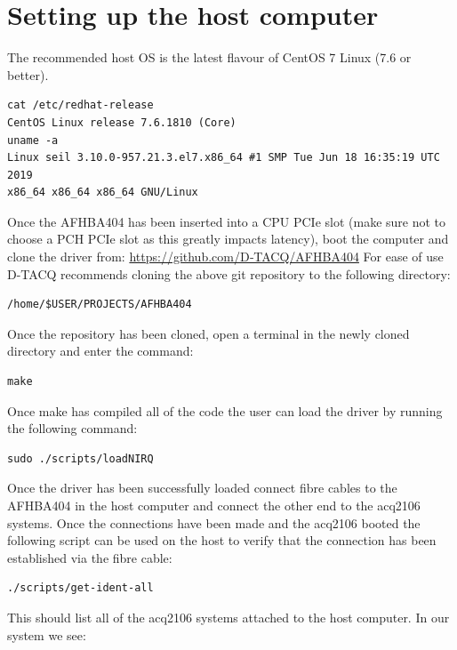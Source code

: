 \documentclass{article}
\begin{document}
\section{Setting up the host computer} \label{settinguphost}
The recommended host OS is the latest flavour of CentOS 7 Linux (7.6 or better).

\begin{verbatim}
cat /etc/redhat-release 
CentOS Linux release 7.6.1810 (Core) 
uname -a
Linux seil 3.10.0-957.21.3.el7.x86_64 #1 SMP Tue Jun 18 16:35:19 UTC 2019
x86_64 x86_64 x86_64 GNU/Linux
\end{verbatim}

Once the AFHBA404 has been inserted into a CPU PCIe slot (make sure not to choose a PCH PCIe slot as this greatly impacts latency), boot the computer and clone the driver from:
\newline
\href{https://github.com/D-TACQ/AFHBA404}{https://github.com/D‑TACQ/AFHBA404}
\newline
For ease of use \mbox{D-TACQ}  recommends cloning the above git repository to the following directory:

\begin{verbatim}
/home/$USER/PROJECTS/AFHBA404
\end{verbatim}

Once the repository has been cloned, open a terminal in the newly cloned directory and enter the command:

\begin{verbatim}
make
\end{verbatim}

Once make has compiled all of the code the user can load the driver by running the following command:

\begin{verbatim}
sudo ./scripts/loadNIRQ
\end{verbatim}

Once the driver has been successfully loaded connect fibre cables to the AFHBA404 in the host computer and connect the other end to the acq2106 systems.
Once the connections have been made and the acq2106 booted the following script can be used on the host to verify that the connection has been established via the fibre cable:

\begin{verbatim}
./scripts/get-ident-all
\end{verbatim}

This should list all of the acq2106 systems attached to the host computer. In our system we see:
\end{document}
